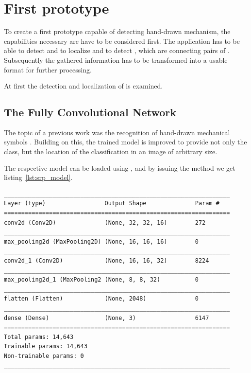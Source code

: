 \section{First prototype} \label{ch:first_prototype}

To create a first prototype capable of detecting hand-drawn mechanism, the capabilities necessary are have to be considered first.
The application has to be able to detect and to localize  and to detect , which are connecting pairs of .
Subsequently the gathered information has to be transformed into a usable format for further processing.

At first the detection and localization of  is examined.

\subsection{The Fully Convolutional Network}\label{ch:fcn}

The topic of a previous work was the recognition of hand-drawn mechanical symbols \cite{Lawrence2020}.
Building on this, the trained model is improved to provide not only the class, but the location of the classification in an image of arbitrary size.

The respective model can be loaded using , %
 and by issuing the  method we get listing~\ref{lst:srp_model}.

\begin{lstlisting}[caption={Summary of Symbol Classifier}, label={lst:srp_model}]
_________________________________________________________________
Layer (type)                 Output Shape              Param #
=================================================================
conv2d (Conv2D)              (None, 32, 32, 16)        272
_________________________________________________________________
max_pooling2d (MaxPooling2D) (None, 16, 16, 16)        0
_________________________________________________________________
conv2d_1 (Conv2D)            (None, 16, 16, 32)        8224
_________________________________________________________________
max_pooling2d_1 (MaxPooling2 (None, 8, 8, 32)          0
_________________________________________________________________
flatten (Flatten)            (None, 2048)              0
_________________________________________________________________
dense (Dense)                (None, 3)                 6147
=================================================================
Total params: 14,643
Trainable params: 14,643
Non-trainable params: 0
_________________________________________________________________
\end{lstlisting}

